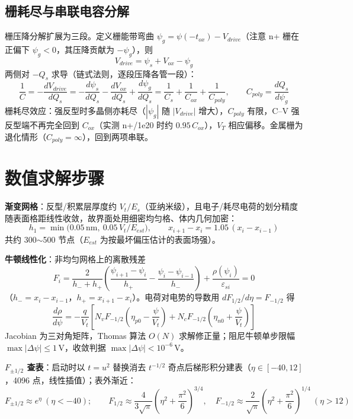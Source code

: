 \documentclass[11pt]{ctexart}
\begin{document}
\subsection{栅耗尽与串联电容分解}
栅压降分解扩展为三段。定义栅能带弯曲
\(\psi_g=\psi(-t_{ox})-V_{drive}\)（注意 n+ 栅在正偏下 $\psi_g<0$，其压降贡献为 $-\psi_g$），则
\[V_{drive}=\psi_s+V_{ox}-\psi_g\]
两侧对 $-Q_s$ 求导（链式法则，逐段压降各管一段）：
\[\frac{1}{C}=-\frac{dV_{drive}}{dQ_s}=-\frac{d\psi_s}{dQ_s}-\frac{dV_{ox}}{dQ_s}+\frac{d\psi_g}{dQ_s}=\frac{1}{C_s}+\frac{1}{C_{ox}}+\frac{1}{C_{poly}},\qquad C_{poly}=\frac{dQ_s}{d\psi_g}\]
栅耗尽效应：强反型时多晶侧亦耗尽（$|\psi_g|$ 随 $|V_{drive}|$ 增大），$C_{poly}$ 有限，C–V 强反型端不再完全回到 $C_{ox}$（实测 n+/1e20 时约 $0.95\,C_{ox}$），$V_T$ 相应偏移。金属栅为退化情形（$C_{poly}=\infty$），回到两项串联。

\section{数值求解步骤}

\textbf{渐变网格}：反型/积累层厚度约 $V_t/E_s$（亚纳米级），且电子/耗尽电荷的划分精度随表面格距线性收敛，故界面处用细密均匀格、体内几何加密：
\[h_1=\min\big(0.05\,\mathrm{nm},\ 0.05\,V_t/E_{est}\big),\qquad x_{i+1}-x_i=1.05\,(x_i-x_{i-1})\]
共约 300$\sim$500 节点（$E_{est}$ 为按最坏偏压估计的表面场强）。

\textbf{牛顿线性化}：非均匀网格上的离散残差
\[F_i=\frac{2}{h_-+h_+}\left(\frac{\psi_{i+1}-\psi_i}{h_+}-\frac{\psi_i-\psi_{i-1}}{h_-}\right)+\frac{\rho(\psi_i)}{\varepsilon_{si}}=0\]
（$h_-=x_i-x_{i-1}$，$h_+=x_{i+1}-x_i$）。电荷对电势的导数用
\(dF_{1/2}/d\eta=F_{-1/2}\) 得
\[\frac{d\rho}{d\psi}=-\frac{q}{V_t}\left[N_vF_{-1/2}\!\left(\eta_{p0}-\frac{\psi}{V_t}\right)+N_cF_{-1/2}\!\left(\eta_{n0}+\frac{\psi}{V_t}\right)\right]\]
Jacobian 为三对角矩阵，Thomas 算法 $O(N)$ 求解修正量；阻尼牛顿单步限幅
\(\max|\Delta\psi|\le 1\,\mathrm{V}\)，收敛判据
\(\max|\Delta\psi|<10^{-6}\,\mathrm{V}\)。

\textbf{$F_{\pm1/2}$ 查表}：启动时以 $t=u^2$ 替换消去 $t^{-1/2}$ 奇点后梯形积分建表（$\eta\in[-40,12]$，4096 点，线性插值）；表外渐近：
\[F_{\pm1/2}\approx e^{\eta}\ (\eta<-40);\qquad F_{1/2}\approx\frac{4}{3\sqrt{\pi}}\left(\eta^2+\frac{\pi^2}{6}\right)^{3/4},\quad F_{-1/2}\approx\frac{2}{\sqrt{\pi}}\left(\eta^2+\frac{\pi^2}{6}\right)^{1/4}\ (\eta>12)\]
\end{document}
